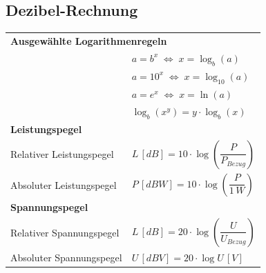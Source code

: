 \documentclass[a4paper,12pt]{scrartcl}
\begin{document}
\subsection{Dezibel-Rechnung}
\begin{tabular}{@{} l l @{}}

\multicolumn{2}{l}{\textbf{Ausgewählte Logarithmenregeln}} \\
& $a = b^x \;\Leftrightarrow\; x = \log_b(a)$ \\
& $a = 10^x \;\Leftrightarrow\; x = \log_{10}(a)$ \\
& $a = e^x \;\Leftrightarrow\; x = \ln(a)$ \\
& $\log_b(x^y) = y\cdot\log_b(x)$ \\[3mm]

\multicolumn{2}{l}{\textbf{Leistungspegel}} \\
\hspace*{20mm} Relativer Leistungspegel & $L\,[dB] = 10\cdot\log\!\left(\dfrac{P}{P_{Bezug}}\right)$ \\
\hspace*{20mm} Absoluter Leistungspegel & $P\,[dBW] = 10\cdot\log\!\left(\dfrac{P}{1\,W}\right)$ \\[3mm]

\multicolumn{2}{l}{\textbf{Spannungspegel}} \\
\hspace*{20mm} Relativer Spannungspegel & $L\,[dB] = 20\cdot\log\!\left(\dfrac{U}{U_{Bezug}}\right)$ \\
\hspace*{20mm} Absoluter Spannungspegel & $U\,[dBV] = 20\cdot\log U\,[V]$ \\

\end{tabular}
\end{document}
